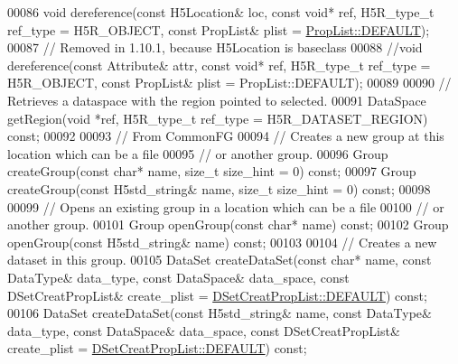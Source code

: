 \begin{DoxyCode}
00086         \textcolor{keywordtype}{void} dereference(\textcolor{keyword}{const} H5Location& loc, \textcolor{keyword}{const} \textcolor{keywordtype}{void}* ref, H5R\_type\_t ref\_type = H5R\_OBJECT, \textcolor{keyword}{const} 
      PropList& plist = \hyperlink{class_h5_1_1_prop_list_ae52af66ce82af0ea7e6dc57148c56241}{PropList::DEFAULT});
00087         \textcolor{comment}{// Removed in 1.10.1, because H5Location is baseclass}
00088         \textcolor{comment}{//void dereference(const Attribute& attr, const void* ref, H5R\_type\_t ref\_type = H5R\_OBJECT, const
       PropList& plist = PropList::DEFAULT);}
00089 
00090         \textcolor{comment}{// Retrieves a dataspace with the region pointed to selected.}
00091         DataSpace getRegion(\textcolor{keywordtype}{void} *ref, H5R\_type\_t ref\_type = H5R\_DATASET\_REGION) \textcolor{keyword}{const};
00092 
00093 \textcolor{comment}{// From CommonFG}
00094         \textcolor{comment}{// Creates a new group at this location which can be a file}
00095         \textcolor{comment}{// or another group.}
00096         Group createGroup(\textcolor{keyword}{const} \textcolor{keywordtype}{char}* name, \textcolor{keywordtype}{size\_t} size\_hint = 0) \textcolor{keyword}{const};
00097         Group createGroup(\textcolor{keyword}{const} H5std\_string& name, \textcolor{keywordtype}{size\_t} size\_hint = 0) \textcolor{keyword}{const};
00098 
00099         \textcolor{comment}{// Opens an existing group in a location which can be a file}
00100         \textcolor{comment}{// or another group.}
00101         Group openGroup(\textcolor{keyword}{const} \textcolor{keywordtype}{char}* name) \textcolor{keyword}{const};
00102         Group openGroup(\textcolor{keyword}{const} H5std\_string& name) \textcolor{keyword}{const};
00103 
00104         \textcolor{comment}{// Creates a new dataset in this group.}
00105         DataSet createDataSet(\textcolor{keyword}{const} \textcolor{keywordtype}{char}* name, \textcolor{keyword}{const} DataType& data\_type, \textcolor{keyword}{const} DataSpace& data\_space, \textcolor{keyword}{
      const} DSetCreatPropList& create\_plist = \hyperlink{class_h5_1_1_d_set_creat_prop_list_aea0be1dc39378736daeac7af787bbc8e}{DSetCreatPropList::DEFAULT}) \textcolor{keyword}{const};
00106         DataSet createDataSet(\textcolor{keyword}{const} H5std\_string& name, \textcolor{keyword}{const} DataType& data\_type, \textcolor{keyword}{const} DataSpace& 
      data\_space, \textcolor{keyword}{const} DSetCreatPropList& create\_plist = \hyperlink{class_h5_1_1_d_set_creat_prop_list_aea0be1dc39378736daeac7af787bbc8e}{DSetCreatPropList::DEFAULT}) \textcolor{keyword}{const};

\end{DoxyCode}

